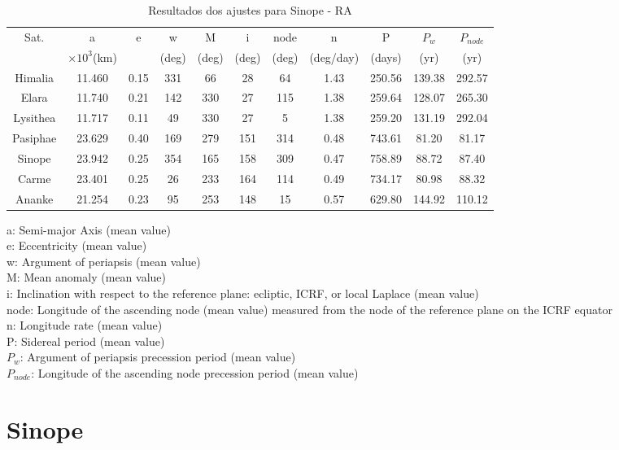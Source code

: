 \documentclass[11pt,a4paper]{report}
\begin{document}
\begin{table}[h!]
\caption{\label{Tab: Sinope-RA} Resultados dos ajustes para Sinope - RA}
\begin{centering}
\begin{tabular}{ccccccccccc}
\hline
\hline
Sat.	 &a &	e &	w	&M&	i&	node &	n&	P&	$P_{w}$&	$P_{node}$\\
&$\times10^{3}$(km)&	&(deg)&	(deg)&	(deg)&	(deg)&	(deg/day)&	(days)&	(yr)	&(yr)	\\
\hline
Himalia&	11.460&	0.15&	331&	66&	28&	64&	1.43&	250.56&	139.38&	292.57\\
Elara& 	11.740&	0.21&	142&	330&	27&	115&	1.38&	259.64&	128.07&	265.30\\
Lysithea&	11.717&	0.11&	49&	330&	27&	5&	1.38&	259.20&	131.19&	292.04\\
Pasiphae	&23.629&	0.40&	169&	279&	151&	314&	0.48&	743.61&	81.20&	81.17\\
Sinope&	23.942&	0.25&	354&	165&	158&	309&	0.47&	758.89&	88.72&	87.40\\
Carme&	23.401&	0.25&	26&	233&	164&	114&	0.49&	734.17&	80.98&	88.32\\
Ananke&	21.254&	0.23&	95&	253&	148&	15&	0.57&	629.80&	144.92&	110.12\\
\hline 
\end{tabular} 
\par\end{centering}
\end{table}

a: Semi-major Axis (mean value)\\
\indent e: Eccentricity (mean value)\\
\indent w: Argument of periapsis (mean value)\\
\indent M: Mean anomaly (mean value)\\
\indent i: Inclination with respect to the reference plane: ecliptic, ICRF, or local Laplace (mean value)\\
\indent node: Longitude of the ascending node (mean value) measured from the node of the reference plane on the ICRF equator\\
\indent n: Longitude rate (mean value)\\
\indent P: Sidereal period (mean value)\\
\indent $P_{w}$: Argument of periapsis precession period (mean value)\\
\indent $P_{node}$: Longitude of the ascending node precession period (mean value)


\chapter*{Sinope}
\end{document}
